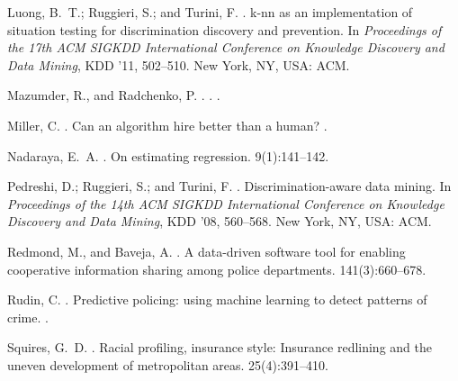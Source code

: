 \documentclass[letterpaper]{article} %
\theoremstyle{definition}
\newcommand{\1}{\ensuremath{{\rm e}}} %
\begin{document}
\begin{thebibliography}{}
	Luong, B.~T.; Ruggieri, S.; and Turini, F.
	.
	\newblock k-nn as an implementation of situation testing for discrimination
	discovery and prevention.
	\newblock In {\em Proceedings of the 17th ACM SIGKDD International Conference
		on Knowledge Discovery and Data Mining}, KDD '11,  502--510.
	\newblock New York, NY, USA: ACM.
	
	{Mazumder}, R., and {Radchenko}, P.
	.
	.
	.
	
	Miller, C.
	.
	\newblock Can an algorithm hire better than a human?
	.
	
	Nadaraya, E.~A.
	.
	\newblock On estimating regression.
	 9(1):141--142.
	
	Pedreshi, D.; Ruggieri, S.; and Turini, F.
	.
	\newblock Discrimination-aware data mining.
	\newblock In {\em Proceedings of the 14th ACM SIGKDD International Conference
		on Knowledge Discovery and Data Mining}, KDD '08,  560--568.
	\newblock New York, NY, USA: ACM.
	
	Redmond, M., and Baveja, A.
	.
	\newblock A data-driven software tool for enabling cooperative information
	sharing among police departments.
	 141(3):660--678.
	
	Rudin, C.
	.
	\newblock Predictive policing: using machine learning to detect patterns of
	crime.
	.
	
	Squires, G.~D.
	.
	\newblock Racial profiling, insurance style: Insurance redlining and the uneven
	development of metropolitan areas.
	 25(4):391--410.
	

\end{thebibliography}
\end{document}
